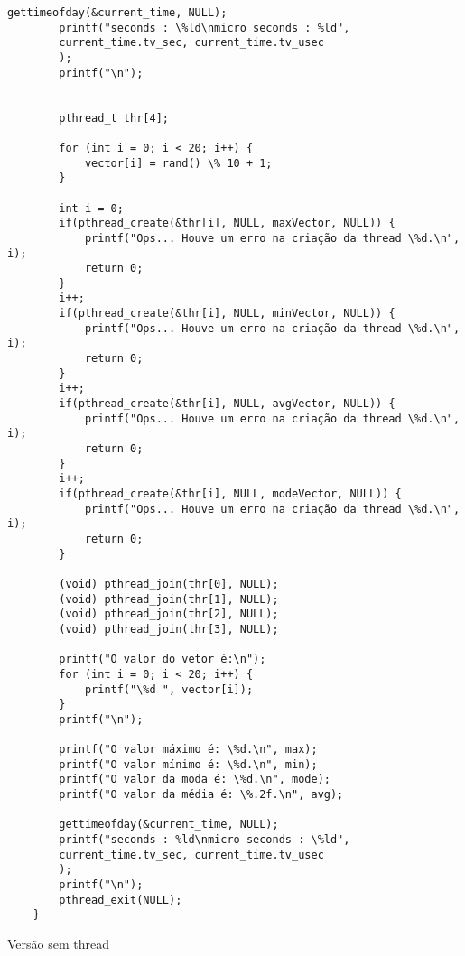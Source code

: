 \begin{lstlisting}[style=CStyle]
        gettimeofday(&current_time, NULL);
        printf("seconds : \%ld\nmicro seconds : %ld",    
        current_time.tv_sec, current_time.tv_usec
        );
        printf("\n");
    
    
        pthread_t thr[4];
    
        for (int i = 0; i < 20; i++) {
            vector[i] = rand() \% 10 + 1;
        }
    
        int i = 0;
        if(pthread_create(&thr[i], NULL, maxVector, NULL)) {
            printf("Ops... Houve um erro na criação da thread \%d.\n", i);
            return 0;
        }
        i++;
        if(pthread_create(&thr[i], NULL, minVector, NULL)) {
            printf("Ops... Houve um erro na criação da thread \%d.\n", i);
            return 0;
        }
        i++;
        if(pthread_create(&thr[i], NULL, avgVector, NULL)) {
            printf("Ops... Houve um erro na criação da thread \%d.\n", i);
            return 0;
        }
        i++;
        if(pthread_create(&thr[i], NULL, modeVector, NULL)) {
            printf("Ops... Houve um erro na criação da thread \%d.\n", i);
            return 0;
        }
    
        (void) pthread_join(thr[0], NULL);
        (void) pthread_join(thr[1], NULL);
        (void) pthread_join(thr[2], NULL);
        (void) pthread_join(thr[3], NULL);
    
        printf("O valor do vetor é:\n");
        for (int i = 0; i < 20; i++) {
            printf("\%d ", vector[i]);
        }
        printf("\n");
    
        printf("O valor máximo é: \%d.\n", max);
        printf("O valor mínimo é: \%d.\n", min);
        printf("O valor da moda é: \%d.\n", mode);
        printf("O valor da média é: \%.2f.\n", avg);
        
        gettimeofday(&current_time, NULL);
        printf("seconds : %ld\nmicro seconds : \%ld",    
        current_time.tv_sec, current_time.tv_usec
        );
        printf("\n");
        pthread_exit(NULL);
    }    
\end{lstlisting}

Versão sem thread

